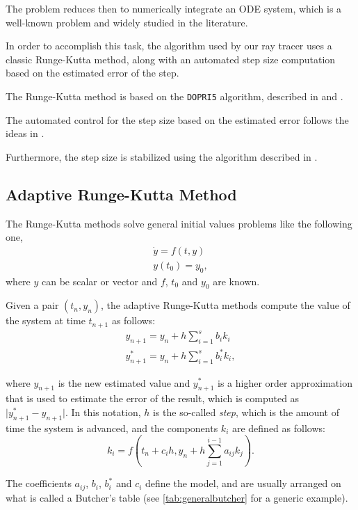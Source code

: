 The problem reduces then to numerically integrate an \ac{ODE} system, which is a well-known problem and widely studied in the literature.

In order to accomplish this task, the algorithm used by our ray tracer uses a classic Runge-Kutta method, along with an automated step size computation based on the estimated error of the step.

The Runge-Kutta method is based on the \texttt{DOPRI5} algorithm, described in \cite{hairer93} and \cite{hairer96}.

The automated control for the step size based on the estimated error follows the ideas in \cite[Sec. II.4, Subsec. Automatic Step Size Control]{hairer93}.

Furthermore, the step size is stabilized using the algorithm described in \cite[Sec. IV.2]{hairer96}.

\subsection{Adaptive Runge-Kutta Method}

The Runge-Kutta methods solve general initial values problems like the following one,
\begin{align*}
	\dot{y} = f(t,y) \\
	y(t_0) = y_0,
\end{align*}
where $y$ can be scalar or vector and $f$, $t_0$ and $y_0$ are known.

Given a pair $(t_n, y_n)$, the adaptive Runge-Kutta methods compute the value of the system at time $t_{n+1}$ as follows:
\begin{align*}
	y_{n+1} = y_n + h \sum_{i=1}^s b_i k_i\\
	y^*_{n+1} = y_n + h \sum_{i=1}^s b^*_i k_i,
\end{align*}

where $y_{n+1}$ is the new estimated value and $y^*_{n+1}$ is a higher order approximation that is used to estimate the error of the result, which is computed as $\vert y^*_{n+1} - y_{n+1} \vert$. In this notation, $h$ is the so-called \emph{step}, which is the amount of time the system is advanced, and the components $k_i$ are defined as follows:
\[
	k_i = f(t_n + c_ih, y_n + h\sum_{j=1}^{i-1} a_{ij} k_j).
\]

The coefficients $a_{ij}$, $b_i$, $b_i^*$ and $c_i$ define the model, and are usually arranged on what is called a Butcher's table (see \autoref{tab:generalbutcher} for a generic example).

